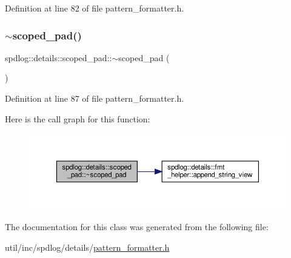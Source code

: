 Definition at line 82 of file pattern\+\_\+formatter.\+h.

\mbox{\label{classspdlog_1_1details_1_1scoped__pad_ad901678fa607829f784cd293f712a112}} 
\subsubsection{\texorpdfstring{$\sim$scoped\+\_\+pad()}{~scoped\_pad()}}
{\footnotesize\ttfamily spdlog\+::details\+::scoped\+\_\+pad\+::$\sim$scoped\+\_\+pad (\begin{DoxyParamCaption}{ }\end{DoxyParamCaption})\hspace{0.3cm}{\ttfamily [inline]}}



Definition at line 87 of file pattern\+\_\+formatter.\+h.

Here is the call graph for this function\+:
\nopagebreak
\begin{figure}[H]
\begin{center}
\leavevmode
\includegraphics[width=350pt]{classspdlog_1_1details_1_1scoped__pad_ad901678fa607829f784cd293f712a112_cgraph}
\end{center}
\end{figure}


The documentation for this class was generated from the following file\+:\begin{DoxyCompactItemize}
\item 
util/inc/spdlog/details/\hyperlink{pattern__formatter_8h}{pattern\+\_\+formatter.\+h}\end{DoxyCompactItemize}

